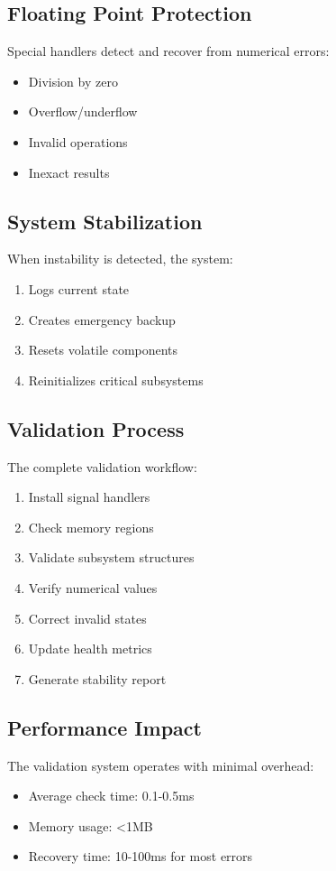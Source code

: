 \documentclass{article}
\begin{document}
\subsection{Floating Point Protection}
Special handlers detect and recover from numerical errors:
\begin{itemize}[leftmargin=*]
\item Division by zero
\item Overflow/underflow
\item Invalid operations
\item Inexact results
\end{itemize}

\subsection{System Stabilization}
When instability is detected, the system:
\begin{enumerate}[leftmargin=*]
\item Logs current state
\item Creates emergency backup
\item Resets volatile components
\item Reinitializes critical subsystems
\end{enumerate}

\subsection{Validation Process}
The complete validation workflow:
\begin{enumerate}[leftmargin=*]
\item Install signal handlers
\item Check memory regions
\item Validate subsystem structures
\item Verify numerical values
\item Correct invalid states
\item Update health metrics
\item Generate stability report
\end{enumerate}

\subsection{Performance Impact}
The validation system operates with minimal overhead:
\begin{itemize}[leftmargin=*]
\item Average check time: 0.1-0.5ms
\item Memory usage: <1MB
\item Recovery time: 10-100ms for most errors
\end{itemize}
\end{document}
